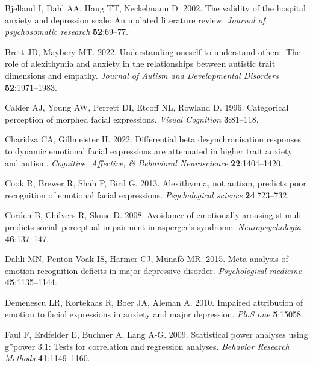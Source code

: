 \documentclass[
]{article}
\newlength{\cslhangindent}
\newlength{\cslentryspacingunit} %
\newenvironment{CSLReferences}[2] %
 {%
  \setlength{\parindent}{0pt}
  \ifodd #1
  \let\oldpar\par
  \def\par{\hangindent=\cslhangindent\oldpar}
  \fi
  \setlength{\parskip}{#2\cslentryspacingunit}
 }%
 {}
\begin{document}
\begin{CSLReferences}{1}{0}
\leavevmode{}%
Bjelland I, Dahl AA, Haug TT, Neckelmann D. 2002. The validity of the hospital anxiety and depression scale: An updated literature review. \emph{Journal of psychosomatic research} \textbf{52}:69--77.

\leavevmode{}%
Brett JD, Maybery MT. 2022. Understanding oneself to understand others: The role of alexithymia and anxiety in the relationships between autistic trait dimensions and empathy. \emph{Journal of Autism and Developmental Disorders} \textbf{52}:1971--1983.

\leavevmode{}%
Calder AJ, Young AW, Perrett DI, Etcoff NL, Rowland D. 1996. Categorical perception of morphed facial expressions. \emph{Visual Cognition} \textbf{3}:81--118.

\leavevmode{}%
Charidza CA, Gillmeister H. 2022. Differential beta desynchronisation responses to dynamic emotional facial expressions are attenuated in higher trait anxiety and autism. \emph{Cognitive, Affective, \& Behavioral Neuroscience} \textbf{22}:1404--1420.

\leavevmode{}%
Cook R, Brewer R, Shah P, Bird G. 2013. Alexithymia, not autism, predicts poor recognition of emotional facial expressions. \emph{Psychological science} \textbf{24}:723--732.

\leavevmode{}%
Corden B, Chilvers R, Skuse D. 2008. Avoidance of emotionally arousing stimuli predicts social--perceptual impairment in asperger's syndrome. \emph{Neuropsychologia} \textbf{46}:137--147.

\leavevmode{}%
Dalili MN, Penton-Voak IS, Harmer CJ, Munafò MR. 2015. Meta-analysis of emotion recognition deficits in major depressive disorder. \emph{Psychological medicine} \textbf{45}:1135--1144.

\leavevmode{}%
Demenescu LR, Kortekaas R, Boer JA, Aleman A. 2010. Impaired attribution of emotion to facial expressions in anxiety and major depression. \emph{PloS one} \textbf{5}:15058.

\leavevmode{}%
Faul F, Erdfelder E, Buchner A, Lang A-G. 2009. Statistical power analyses using g*power 3.1: Tests for correlation and regression analyses. \emph{Behavior Research Methods} \textbf{41}:1149--1160.


\end{CSLReferences}
\end{document}
